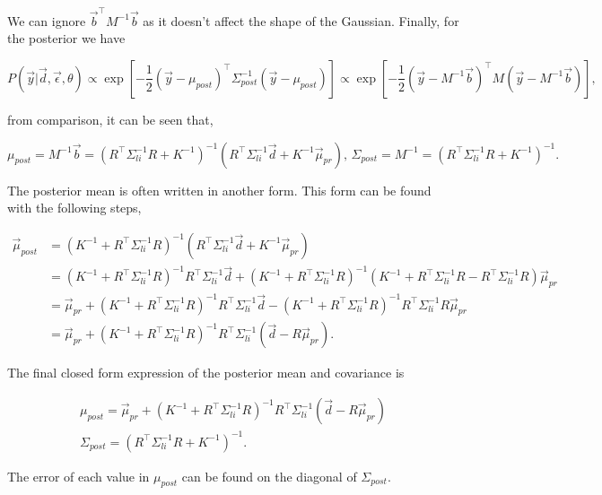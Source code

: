 \noindent We can ignore $\vec b^\top M^{-1} \vec b$ as it doesn't affect the shape of the Gaussian. Finally, for the posterior we have

$$
P(\vec{y}|\vec{d},\vec\epsilon, \theta) \propto \exp \left[ -\frac{1}{2}(\vec y - \mu_{post})^{\top} \Sigma^{-1}_{post} (\vec y - \mu_{post}) \right] \propto \exp \left[ -\frac{1}{2} (\vec y - M^{-1}\vec b)^\top M (\vec y - M^{-1} \vec b)\right],
$$

\noindent from comparison, it can be seen that,

\begin{equation}
\mu_{post} = M^{-1} \vec b = \left(R^\top \Sigma_{li}^{-1} R + K^{-1}\right)^{-1} \left(R^{\top} \Sigma_{li}^{-1}\vec d + K^{-1} \vec \mu_{pr}\right), \, \Sigma_{post} = M^{-1} = \left(R^\top \Sigma_{li}^{-1} R + K^{-1}\right)^{-1}.
\end{equation}

\noindent The posterior mean is often written in another form. This form can be found with the following steps,

$$
\begin{aligned}
\vec{\mu}_{post} &= (K^{-1} + R^{\top} \Sigma_{li}^{-1} R)^{-1}(R^{\top} \Sigma_{li}^{-1} \vec{d} + K^{-1} \vec{\mu}_{pr}) \\
&= (K^{-1} + R^{\top} \Sigma_{li}^{-1} R)^{-1} R^{\top} \Sigma_{li}^{-1} \vec{d} + (K^{-1} + R^{\top} \Sigma_{li}^{-1} R)^{-1} (K^{-1} + R^{\top} \Sigma_{li}^{-1} R - R^{\top} \Sigma_{li}^{-1} R) \vec{\mu}_{pr} \\
&= \vec{\mu}_{pr} + (K^{-1} + R^{\top} \Sigma_{li}^{-1} R)^{-1} R^{\top} \Sigma_{li}^{-1} \vec{d} - (K^{-1} + R^{\top} \Sigma_{li}^{-1} R)^{-1} R^{\top} \Sigma_{li}^{-1} R \vec{\mu}_{pr} \\
&= \vec{\mu}_{pr} + (K^{-1} + R^{\top} \Sigma_{li}^{-1} R)^{-1} R^{\top} \Sigma_{li}^{-1} (\vec{d} - R \vec{\mu}_{pr}).
\end{aligned}
$$

\noindent The final closed form expression of the posterior mean and covariance is

\begin{gather}
\mu_{post}= \vec{\mu}_{pr} + (K^{-1} + R^{\top} \Sigma_{li}^{-1} R)^{-1} R^{\top} \Sigma_{li}^{-1} (\vec{d} - R \vec{\mu}_{pr})\\
\Sigma_{post} = \left(R^\top \Sigma_{li}^{-1} R + K^{-1}\right)^{-1}.
\end{gather}

\noindent The error of each value in $\mu_{post}$ can be found on the diagonal of $\Sigma_{post}$.
